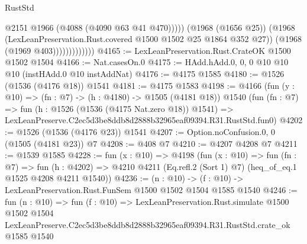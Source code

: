 \begin{lexlean}{RustStd}
\begin{coremodule}
                                @2151
                                @1966
                                (@4088 (@4090 @63 @41 @470)))))
                          (@1968 (@1656 @25))
                          (@1968 (LexLeanPreservation.Rust.covered @1500 @1502 @25 @1864 @352 @27))
                          (@1968 (@1969 @403)))))))))))))
@4165 := LexLeanPreservation.Rust.CrateOK @1500 @1502 @1504
@4166 := Nat.casesOn.{0}
@4175 := HAdd.hAdd.{0, 0, 0} @10 @10 @10 (instHAdd.{0} @10 instAddNat)
@4176 := @4175 @1585
@4180 := @1526 (@1536 (@4176 @18)) @1541
@4181 := @4175 @1583
@4198 := @4166
    (fun (y : @10) => (fn : @7) -> (h : @4180) -> @1505 (@4181 @18))
    @1540
    (fun (fn : @7) =>
    fun (h : @1526 (@1536 (@4175 Nat.zero @18)) @1541) =>
    LexLeanPreserve.C2ec5d3be8ddb8d2888b32965eaf09394.R31.RustStd.fun0)
@4202 := @1526 (@1536 (@4176 @23)) @1541
@4207 := Option.noConfusion.{0, 0} (@1505 (@4181 @23)) @7
@4208 := @408 @7
@4210 := @4207 @4208 @7
@4211 := @1539 @1585
@4228 := fun (x : @10) =>
  @4198
    (fun (x : @10) =>
    fun (fn : @7) =>
    fun (h : @4202) =>
    @4210 @4211 (Eq.refl.{2} (Sort 1) @7) (heq_of_eq.{1} @1525 @4208 @4211 @1540))
@4236 := (n : @10) -> (f : @10) -> LexLeanPreservation.Rust.FunSem @1500 @1502 @1504 @1585 @1540
@4246 := fun (n : @10) =>
  fun (f : @10) =>
  LexLeanPreservation.Rust.simulate
    @1500
    @1502
    @1504
    LexLeanPreserve.C2ec5d3be8ddb8d2888b32965eaf09394.R31.RustStd.crate_ok
    @1585
    @1540
\end{coremodule}
\end{lexlean}
